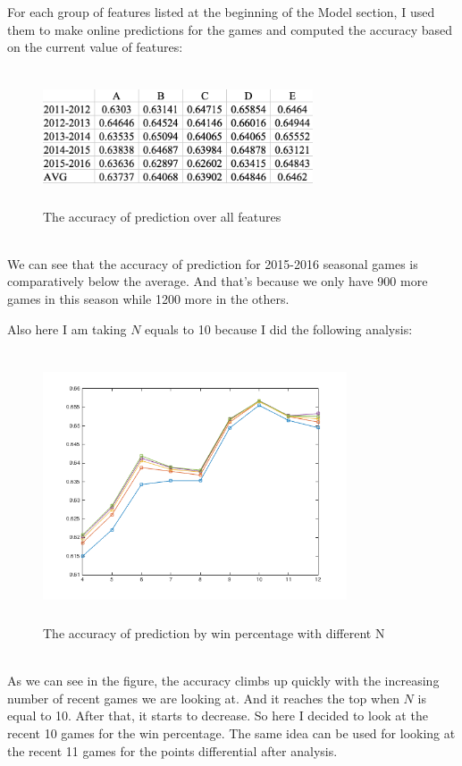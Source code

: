\documentclass{article}
\begin{document}
 For each group of features listed at the beginning of the Model section, I used them to make online predictions for the games and computed the accuracy based on the current value of features:
 \begin{figure}[htbp]
 \centering
 \includegraphics[width=8cm, height=4cm]{dataanalysis}
 \caption{The accuracy of prediction over all features}
\end{figure}
\\
We can see that the accuracy of prediction for 2015-2016 seasonal games is comparatively below the average. And that's because we only have 900 more games in this season while 1200 more in the others.

Also here I am taking $N$ equals to 10 because I did the following analysis:
 \begin{figure}[htbp]
 \centering
 \includegraphics[width=9cm, height=8cm]{bestN}
  \caption{The accuracy of prediction by win percentage with different N}
\end{figure}
\\
 As we can see in the figure, the accuracy climbs up quickly with the increasing number of recent games we are looking at. And it reaches the top when $N$ is equal to 10. After that, it starts to decrease. So here I decided to look at the recent 10 games for the win percentage. The same idea can be used for looking at the recent 11 games for the points differential after analysis.
 
\end{document}
